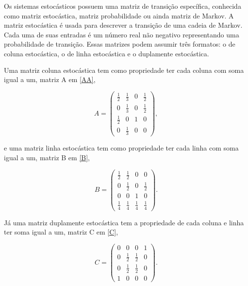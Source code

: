 Os sistemas estocásticos possuem uma matriz de transição específica, conhecida como matriz estocástica, matriz probabilidade ou ainda matriz de Markov. A matriz estocástica é usada para descrever a transição de uma cadeia de Markov. Cada uma de suas entradas é um número real não negativo representando uma probabilidade de transição. Essas matrizes podem assumir três formatos: o de coluna estocástica, o de linha estocástica e o duplamente estocástica. 

Uma matriz coluna estocástica tem como propriedade ter cada coluna com soma igual a um, matriz A em \eqref{AA},


\begin{equation}\label{AA}
A = \begin{pmatrix} 
 		\frac{1}{2}	&	\frac{1}{3}	&	0	&	\frac{1}{2}\\
 			0		&	\frac{1}{3}	& 	0	&	\frac{1}{2}\\
 		\frac{1}{2}	&	0			&	1	&	0\\
 			0		&	\frac{1}{3}	&	0	&	0
		\end{pmatrix},
\end{equation}

\noindent e uma matriz linha estocástica tem como propriedade ter cada linha com soma igual a um, matriz B em \eqref{B},

\begin{equation}\label{B}
B = \begin{pmatrix}
 		\frac{1}{2}	&	\frac{1}{2}	&	0			&	0\\
 			0		&	\frac{1}{2}	&	0			&	\frac{1}{2}\\
 			0		&	0			&	1			& 	0\\
 		\frac{1}{4}	&	\frac{1}{4}	&	\frac{1}{4}	&	\frac{1}{4}
		\end{pmatrix}.
\end{equation} 

\noindent Já uma matriz duplamente estocástica tem a propriedade de cada coluna e linha ter soma igual a um, matriz C em \eqref{C},

\begin{equation}\label{C}
C = \begin{pmatrix}
 		 0	&	0			&	0			& 1 \\
 		 0	&	\frac{1}{2}	&	\frac{1}{2}	& 0 \\
 		 0	&	\frac{1}{2}	&	\frac{1}{2}	& 0 \\
 		 1	&	0			&	0			& 0
		\end{pmatrix}.
\end{equation}

